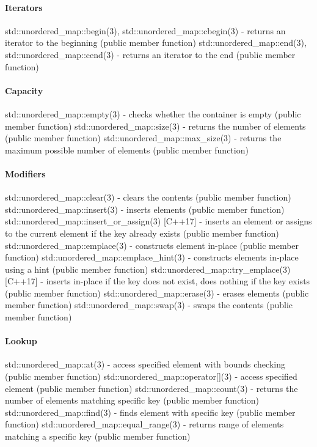 \paragraph{Iterators}
std::unordered\_map::begin(3), std::unordered\_map::cbegin(3) - returns an iterator to the beginning   (public member function)
std::unordered\_map::end(3), std::unordered\_map::cend(3) - returns an iterator to the end   (public member function)
\paragraph{Capacity}
std::unordered\_map::empty(3) - checks whether the container is empty   (public member function)
std::unordered\_map::size(3) - returns the number of elements   (public member function)
std::unordered\_map::max\_size(3) - returns the maximum possible number of elements   (public member function)
\paragraph{Modifiers}
std::unordered\_map::clear(3) - clears the contents   (public member function)
std::unordered\_map::insert(3) - inserts elements   (public member function)
std::unordered\_map::insert\_or\_assign(3) [C++17] - inserts an element or assigns to the current element if the key already exists   (public member function)
std::unordered\_map::emplace(3) - constructs element in-place   (public member function)
std::unordered\_map::emplace\_hint(3) - constructs elements in-place using a hint   (public member function)
std::unordered\_map::try\_emplace(3) [C++17] - inserts in-place if the key does not exist, does nothing if the key exists  (public member function)
std::unordered\_map::erase(3) - erases elements   (public member function)
std::unordered\_map::swap(3) - swaps the contents   (public member function)
\paragraph{Lookup}
std::unordered\_map::at(3) - access specified element with bounds checking   (public member function)
std::unordered\_map::operator[](3) - access specified element   (public member function)
std::unordered\_map::count(3) - returns the number of elements matching specific key   (public member function)
std::unordered\_map::find(3) - finds element with specific key  (public member function)
std::unordered\_map::equal\_range(3) - returns range of elements matching a specific key  (public member function)
